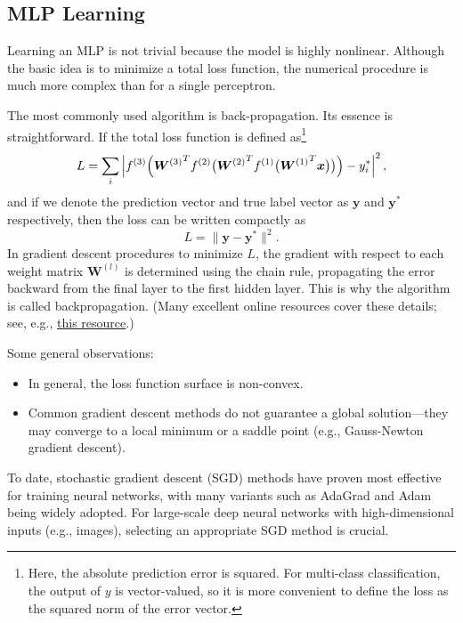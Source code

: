 \documentclass[12pt]{article}
\begin{document}
\subsection{MLP Learning}
Learning an MLP is not trivial because the model is highly nonlinear. Although the basic idea is to minimize a total loss function, the numerical procedure is much more complex than for a single perceptron.

The most commonly used algorithm is back-propagation. Its essence is straightforward. If the total loss function is defined as\footnote{Here, the absolute prediction error is squared. For multi-class classification, the output of $y$ is vector-valued, so it is more convenient to define the loss as the squared norm of the error vector.}
\begin{equation}
L = \sum_i \left|  f^{(3)}\Bigl( {\bm{W}^{(3)}}^T f^{(2)}\bigl( {\bm{W}^{(2)}}^T f^{(1)}\bigl( {\bm{W}^{(1)}}^T \bm{x} \bigr) \bigr) \Bigr) - y_i^* \right|^2,
\label{t05eq09}
\end{equation}
and if we denote the prediction vector and true label vector as \(\bm{y}\) and \(\bm{y}^*\) respectively, then the loss can be written compactly as
\[
    L = \|\bm{y} - \bm{y}^*\|^2.
\]
In gradient descent procedures to minimize \(L\), the gradient with respect to each weight matrix \(\bm{W}^{(l)}\) is determined using the chain rule, propagating the error backward from the final layer to the first hidden layer. This is why the algorithm is called backpropagation. (Many excellent online resources cover these details; see, e.g., \href{http://neuralnetworksanddeeplearning.com/chap2.html}{this resource}.)

Some general observations:
\begin{itemize}
    \item In general, the loss function surface is non-convex.
    \item Common gradient descent methods do not guarantee a global solution---they may converge to a local minimum or a saddle point (e.g., Gauss-Newton gradient descent).
\end{itemize}

To date, stochastic gradient descent (SGD) methods have proven most effective for training neural networks, with many variants such as AdaGrad and Adam being widely adopted. For large-scale deep neural networks with high-dimensional inputs (e.g., images), selecting an appropriate SGD method is crucial.
\end{document}
